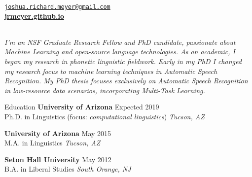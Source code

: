 \documentclass{resume} %
\begin{document}
\vspace{-.5cm}
\begin{center}
  \href{mailto:joshua.richard.meyer@gmail.com}{\nolinkurl{joshua.richard.meyer@gmail.com}}\\
  \href{https://jrmeyer.github.io}{\textbf{jrmeyer.github.io}} \\
  \href{https://github.com/JRMeyer}{\faGithub} \hspace{.25cm} \href{https://www.linkedin.com/in/josh-r-meyer/}{\faLinkedin} \\

\vspace{.05cm}

\textit{I'm an NSF Graduate Research Fellow and PhD candidate, passionate about Machine Learning and open-source language technologies. As an academic, I began my research in phonetic linguistic fieldwork. Early in my PhD I changed my research focus to machine learning techniques in Automatic Speech Recognition. My PhD thesis focuses exclusively on Automatic Speech Recognition in low-resource data scenarios, incorporating Multi-Task Learning.}\\
\end{center}


\begin{rSection}{Education}
{\bf University of Arizona} \hfill {Expected 2019} \\ 
Ph.D. in Linguistics (focus: \textit{computational linguistics}) \hfill {\em Tucson, AZ}

{\bf University of Arizona} \hfill {May 2015} \\ 
M.A. in Linguistics \hfill {\em Tucson, AZ}

{\bf Seton Hall University} \hfill {May 2012} \\ 
B.A. in Liberal Studies  \hfill {\em South Orange, NJ} \\
\end{rSection}

\end{document}
